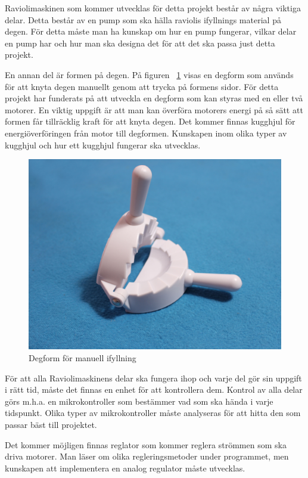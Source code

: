 Raviolimaskinen som kommer utvecklas för detta projekt består av några viktiga delar. Detta består av en pump som ska hälla raviolis ifyllnings material på degen. För detta måste man ha kunskap om hur en pump fungerar, vilkar delar en pump har och hur man ska designa det för att det ska passa just detta projekt.\medskip

En annan del är formen på degen. På figuren ~\ref{degfrom} visas en degform som används för att knyta degen manuellt genom att trycka på formens sidor. För detta projekt har funderats på att utveckla en degform som kan styras med en eller två motorer. En viktig uppgift är att man kan  överföra motorers energi på så sätt att formen får tillräcklig kraft för att knyta degen. Det kommer finnas kugghjul för energiöverföringen från motor till degformen. Kunskapen inom olika typer av kugghjul och hur ett kugghjul fungerar ska utvecklas.\medskip

\begin{figure}[h]
	\begin{center}
		\includegraphics[scale=0.08] {images/degform.jpg}
		\caption{Degform för manuell ifyllning}
		\label{degfrom}	
	\end{center}
\end{figure}\medskip

För att alla Raviolimaskinens delar ska fungera ihop och varje del gör sin uppgift i rätt tid, måste det finnas en enhet för att kontrollera dem. Kontrol av alla delar görs m.h.a. en mikrokontroller som bestämmer vad som ska hända i varje tidspunkt. Olika typer av mikrokontroller måste analyseras för att hitta den som passar bäst till projektet.

Det kommer möjligen finnas reglator som kommer reglera strömmen som ska driva motorer. Man läser om olika regleringsmetoder under programmet, men kunskapen att implementera en analog regulator måste utvecklas.




